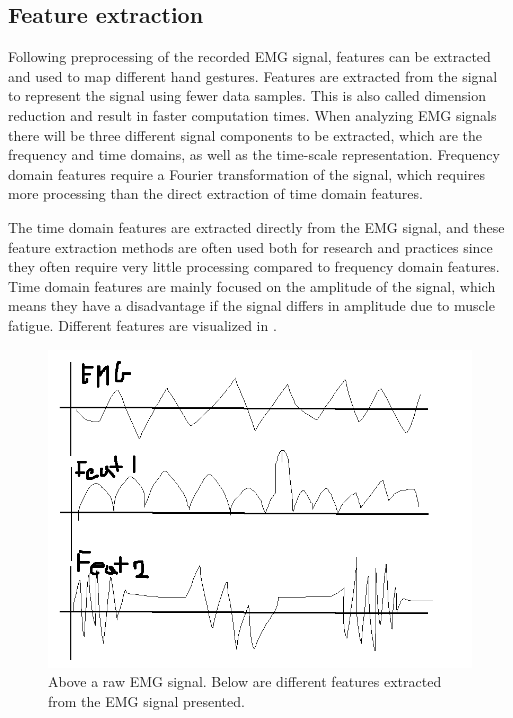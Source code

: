 \subsection{Feature extraction}



Following preprocessing of the recorded EMG signal, features can be extracted and used to map different hand gestures. Features are extracted from the signal to represent the signal using fewer data samples. This is also called dimension reduction and result in faster computation times. When analyzing EMG signals there will be three different signal components to be extracted, which are the frequency and time domains, as well as the time-scale representation. Frequency domain features require a Fourier transformation of the signal, which requires more processing than the direct extraction of time domain features. \cite{phiny2012}

The time domain features are extracted directly from the EMG signal, and these feature extraction methods are often used both for research and practices since they often require very little processing compared to frequency domain features. Time domain features are mainly focused on the amplitude of the signal, which means they have a disadvantage if the signal differs in amplitude due to muscle fatigue. \cite{phiny2012} Different features are visualized in . 

\begin{figure}[H]                    
	\includegraphics[width=.5\textwidth]{figures/background/EMG_features}  %
	\caption{Above a raw EMG signal. Below are different features extracted from the EMG signal presented.}
	\label{fig:EMGfeatures}
\end{figure}

